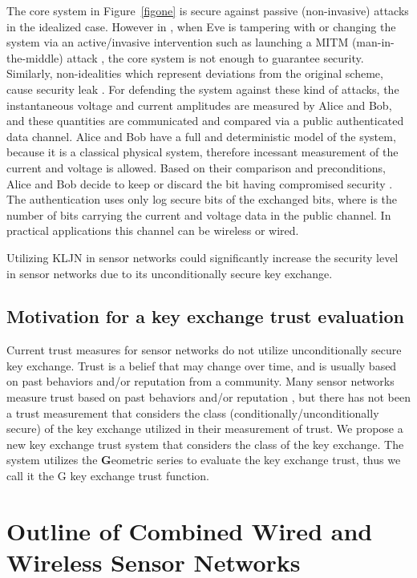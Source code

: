 \documentclass{ws-fnl2}
\begin{document}
The core system in Figure~\ref{figone} is secure against passive (non-invasive) attacks in the idealized case. However in \cite{lk2}, when Eve is tampering with or changing the system via an active/invasive intervention such as launching a MITM (man-in-the-middle) attack \cite{c111}, the core system is not enough to guarantee security. Similarly, non-idealities which represent deviations from the original scheme, cause security leak \cite{lk2}. For defending the system against these kind of attacks, the instantaneous voltage and current amplitudes are measured by Alice and Bob, and these quantities are communicated and compared via a public authenticated data channel. Alice and Bob have a full and deterministic model of the system, because it is a classical physical system, therefore incessant measurement of the current and voltage is allowed. Based on their comparison and preconditions, Alice and Bob decide to keep or discard the bit having compromised security \cite{c111}. The authentication uses only log secure bits of the exchanged bits, where  is the number of bits carrying the current and voltage data in the public channel. In practical applications this channel can be wireless or wired. 



Utilizing KLJN in sensor networks could significantly increase the security level in sensor networks due to its unconditionally secure key exchange.


\subsection{Motivation for a key exchange trust evaluation}

Current trust measures for sensor networks do not utilize unconditionally secure key exchange. Trust is a belief that may change over time, and is usually based on past behaviors and/or reputation from a community. Many sensor networks measure trust based on past behaviors and/or reputation \cite{trust1, trust2, trust3, trust4, trust5, trust6}, but there has not been a trust measurement that considers the class (conditionally/unconditionally secure) of the key exchange utilized in their measurement of trust. We propose a new key exchange trust system that considers the class of the key exchange. The system utilizes the \textbf{G}eometric series to evaluate the key exchange trust, thus we call it the G key exchange trust function.


\section{Outline of Combined Wired and Wireless Sensor Networks}
\end{document}
